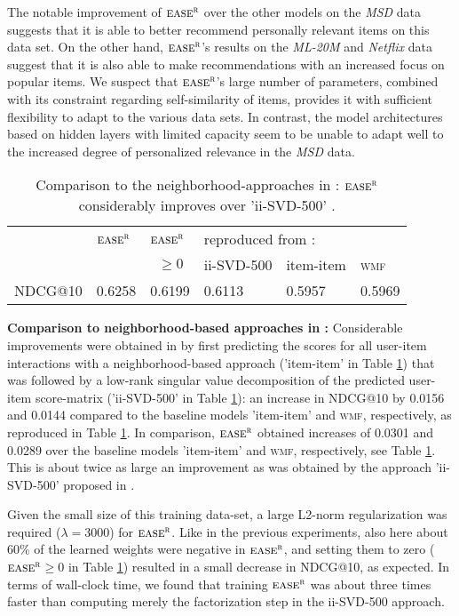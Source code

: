 \documentclass[sigconf]{acmart}
\newcommand{\wmf}{{\scshape wmf}}
\newcommand{\sae}{${\textsc{ease}}^{\textsc{r}}$}
\begin{document}
The notable  improvement of \sae{}  over the other models on the   \emph{MSD} data suggests that it is able to better recommend personally relevant items on this data set. On the other hand, \sae{}'s results on  the  \emph{ML-20M} and \emph{Netflix} data suggest that it is also able to make recommendations with an increased focus on popular items. We suspect that \sae's large number of parameters, combined with its constraint regarding self-similarity of items,  provides it with sufficient flexibility to adapt to the various data sets. In contrast, the model architectures based on hidden layers with limited capacity seem to be unable to adapt well to the increased degree of  personalized relevance in the \emph{MSD} data.




\begin{table}[t]
\caption{Comparison to the neighborhood-approaches in \cite{volkovs15}: \sae{} considerably improves over 'ii-SVD-500' \cite{volkovs15}.}
\label{tab_nn}
\begin{tabular}{llllll}
\hline
        &       \sae{}          &     \sae{}              & \multicolumn{3}{l}{reproduced from \cite{volkovs15}: }\\
       &        & $\,\,\,\ge 0$   &   ii-SVD-500   & item-item    & \wmf{}  \\
\hline
NDCG@10   &      0.6258      &  0.6199       &       0.6113         &      0.5957   &    0.5969\\
\hline
\end{tabular}
\end{table}



{\bf Comparison to neighborhood-based approaches in \cite{volkovs15}:}
Considerable improvements were obtained in \cite{volkovs15} by first predicting the scores for all user-item interactions with a neighborhood-based approach ('item-item' in Table \ref{tab_nn}) that was followed by a low-rank singular value decomposition  of the predicted user-item score-matrix ('ii-SVD-500' in Table \ref{tab_nn}): an increase in NDCG@10 by 0.0156  and 0.0144 compared to  the baseline models  'item-item' and \wmf{}, respectively, as reproduced in Table \ref{tab_nn}. In comparison, \sae{} obtained  increases of 0.0301 and  0.0289  over the baseline models  'item-item' and \wmf{}, respectively, see Table \ref{tab_nn}. This is about twice as large an improvement as was obtained by the approach 'ii-SVD-500' proposed in \cite{volkovs15}.

Given the small size of this training data-set, a  large L2-norm regularization was required ($\lambda=3000$) for \sae{}. Like in the previous experiments, also here about 60\% of the learned weights were negative in \sae, and setting them to zero (\sae{}$\ge 0$ in Table \ref{tab_nn}) resulted in  a small decrease in NDCG@10, as expected. 
 In terms of wall-clock time, we found that training \sae{}  was about three times faster than computing merely the  factorization step in the ii-SVD-500 approach. 
\end{document}
